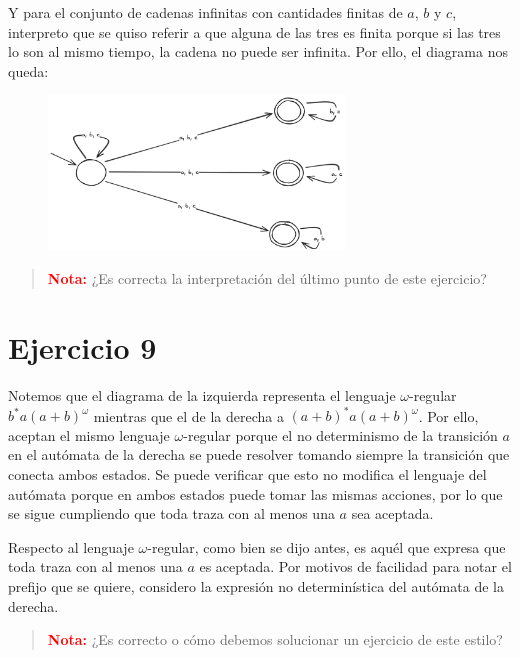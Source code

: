 \documentclass{article}
\begin{document}
\pagebreak
Y para el conjunto de cadenas infinitas con cantidades finitas de $a$, $b$ y $c$, interpreto que se quiso referir a que alguna de las tres es finita porque si las tres lo son al mismo tiempo, la cadena no puede ser infinita.
Por ello, el diagrama nos queda:
\begin{figure}[!htb]
	\includegraphics[width=0.7\textwidth]{04-08-d.png}
	\centering
\end{figure}

\begin{quotation}
	\textbf{\textcolor{Red}{Nota:}} ¿Es correcta la interpretación del último punto de este ejercicio?
\end{quotation}

\section*{Ejercicio 9}
Notemos que el diagrama de la izquierda representa el lenguaje $\omega$-regular $b^*a(a + b)^\omega$ mientras que el de la derecha a $(a + b)^*a(a + b)^\omega$.
Por ello, aceptan el mismo lenguaje $\omega$-regular porque el no determinismo de la transición $a$ en el autómata de la derecha se puede resolver tomando siempre la transición que conecta ambos estados.
Se puede verificar que esto no modifica el lenguaje del autómata porque en ambos estados puede tomar las mismas acciones, por lo que se sigue cumpliendo que toda traza con al menos una $a$ sea aceptada.

Respecto al lenguaje $\omega$-regular, como bien se dijo antes, es aquél que expresa que toda traza con al menos una $a$ es aceptada.
Por motivos de facilidad para notar el prefijo que se quiere, considero la expresión no determinística del autómata de la derecha.

\begin{quotation}
	\textbf{\textcolor{Red}{Nota:}} ¿Es correcto o cómo debemos solucionar un ejercicio de este estilo?
\end{quotation}

\pagebreak
\end{document}
